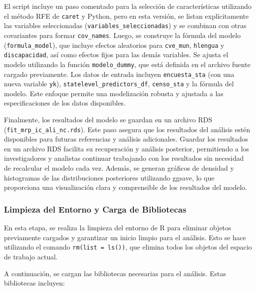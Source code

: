 \documentclass[
  12pt,
]{book}
\begin{document}
El script incluye un paso comentado para la selección de características utilizando el método RFE de \texttt{caret} y Python, pero en esta versión, se listan explícitamente las variables seleccionadas (\texttt{variables\_seleccionadas}) y se combinan con otras covariantes para formar \texttt{cov\_names}. Luego, se construye la fórmula del modelo (\texttt{formula\_model}), que incluye efectos aleatorios para \texttt{cve\_mun}, \texttt{hlengua} y \texttt{discapacidad}, así como efectos fijos para las demás variables. Se ajusta el modelo utilizando la función \texttt{modelo\_dummy}, que está definida en el archivo fuente cargado previamente. Los datos de entrada incluyen \texttt{encuesta\_sta} (con una nueva variable \texttt{yk}), \texttt{statelevel\_predictors\_df}, \texttt{censo\_sta} y la fórmula del modelo. Este enfoque permite una modelización robusta y ajustada a las especificaciones de los datos disponibles.

Finalmente, los resultados del modelo se guardan en un archivo RDS (\texttt{fit\_mrp\_ic\_ali\_nc.rds}). Este paso asegura que los resultados del análisis estén disponibles para futuras referencias y análisis adicionales. Guardar los resultados en un archivo RDS facilita su recuperación y análisis posterior, permitiendo a los investigadores y analistas continuar trabajando con los resultados sin necesidad de recalcular el modelo cada vez. Además, se generan gráficos de densidad y histogramas de las distribuciones posteriores utilizando ggsave, lo que proporciona una visualización clara y comprensible de los resultados del modelo.

\hypertarget{limpieza-del-entorno-y-carga-de-bibliotecas-4}{%
\subsubsection*{Limpieza del Entorno y Carga de Bibliotecas}\label{limpieza-del-entorno-y-carga-de-bibliotecas-4}}

En esta etapa, se realiza la limpieza del entorno de R para eliminar objetos previamente cargados y garantizar un inicio limpio para el análisis. Esto se hace utilizando el comando \texttt{rm(list\ =\ ls())}, que elimina todos los objetos del espacio de trabajo actual.

A continuación, se cargan las bibliotecas necesarias para el análisis. Estas bibliotecas incluyen:
\end{document}
